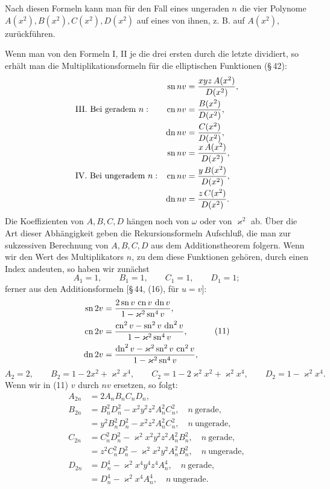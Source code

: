 \documentclass[11pt]{article}
\providecommand{\sn}{\operatorname{sn}}
\providecommand{\cn}{\operatorname{cn}}
\providecommand{\dn}{\operatorname{dn}}
\begin{document}
Nach diesen Formeln kann man für den Fall eines ungeraden $n$ die vier Polynome
$A(x^2),B(x^2),C(x^2),D(x^2)$ auf eines von ihnen, z. B. auf $A(x^2)$, zurückführen.

Wenn man von den Formeln I, II je die drei ersten durch die letzte dividiert, so erhält
man die Multiplikationsformeln für die elliptischen Funktionen (\S\,42):
\[
\begin{array}{ll}
\text{III. Bei geradem }n:
&
\begin{aligned}
\sn nv&={xyz\,A(x^2)\over D(x^2)},\\
\cn nv&={B(x^2)\over D(x^2)},\\
\dn nv&={C(x^2)\over D(x^2)},
\end{aligned}
\\[2.0em]
\text{IV. Bei ungeradem }n:
&
\begin{aligned}
\sn nv&={x\,A(x^2)\over D(x^2)},\\
\cn nv&={y\,B(x^2)\over D(x^2)},\\
\dn nv&={z\,C(x^2)\over D(x^2)}.
\end{aligned}
\end{array}
\]
Die Koeffizienten von $A,B,C,D$ hängen noch von $\omega$ oder von $\varkappa^2$ ab.
Über die Art dieser Abhängigkeit geben die Rekursionsformeln Aufschluß, die man zur
sukzessiven Berechnung von $A,B,C,D$ aus dem Additionstheorem folgern. Wenn wir den
Wert des Multiplikators $n$, zu dem diese Funktionen gehören, durch einen Index andeuten,
so haben wir zunächst
\begin{equation}
A_1=1,\qquad B_1=1,\qquad C_1=1,\qquad D_1=1;
\tag{10}
\end{equation}
ferner aus den Additionsformeln [\S\,44, (16), für $u=v$]:
\begin{equation}
\begin{aligned}
\sn 2v&={2\sn v\,\cn v\,\dn v\over 1-\varkappa^2\sn^4 v},\\
\cn 2v&={\cn^2 v-\sn^2 v\,\dn^2 v\over 1-\varkappa^2\sn^4 v},\\
\dn 2v&={\dn^2 v-\varkappa^2\sn^2 v\,\cn^2 v\over 1-\varkappa^2\sn^4 v},
\end{aligned}
\tag{11}
\end{equation}
\[
A_2=2,\qquad B_2=1-2x^2+\varkappa^2x^4,\qquad
C_2=1-2\varkappa^2x^2+\varkappa^2x^4,\qquad D_2=1-\varkappa^2x^4.
\tag{12}
\]
Wenn wir in (11) $v$ durch $nv$ ersetzen, so folgt:
\begin{equation}
\begin{aligned}
A_{2n}&=2A_nB_nC_nD_n,\\
B_{2n}&=B_n^2D_n^2-x^2y^2z^2A_n^2C_n^2,\quad n\ \text{gerade},\\
&=y^2B_n^2D_n^2-x^2z^2A_n^2C_n^2,\quad n\ \text{ungerade},\\
C_{2n}&=C_n^2D_n^2-\varkappa^2x^2y^2z^2A_n^2B_n^2,\quad n\ \text{gerade},\\
&=z^2C_n^2D_n^2-\varkappa^2x^2y^2A_n^2B_n^2,\quad n\ \text{ungerade},\\
D_{2n}&=D_n^4-\varkappa^2x^4y^4z^4A_n^4,\quad n\ \text{gerade},\\
&=D_n^4-\varkappa^2x^4A_n^4,\quad n\ \text{ungerade}.
\end{aligned}
\tag{13}
\end{equation}
\end{document}
